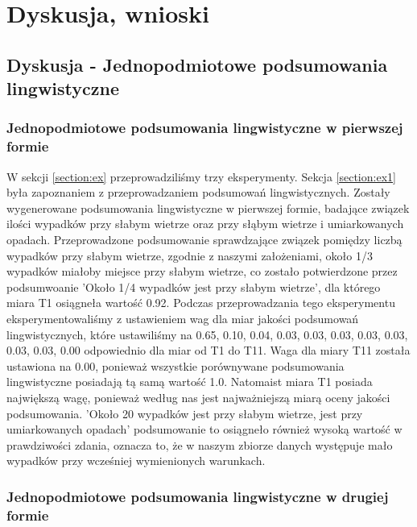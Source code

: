 \documentclass{classrep}
\begin{document}
\newpage


\section{Dyskusja, wnioski}
\subsection{Dyskusja - Jednopodmiotowe podsumowania lingwistyczne}

\subsubsection{Jednopodmiotowe podsumowania lingwistyczne w pierwszej formie}

W sekcji \ref{section:ex} przeprowadziliśmy trzy eksperymenty. Sekcja \ref{section:ex1} była zapoznaniem z przeprowadzaniem podsumowań lingwistycznych. Zostały wygenerowane podsumowania lingwistyczne w pierwszej formie, badające związek ilości wypadków przy słabym wietrze oraz przy słąbym wietrze i umiarkowanych opadach. Przeprowadzone podsumowanie sprawdzające związek pomiędzy liczbą wypadków przy słabym wietrze, zgodnie z naszymi założeniami, około 1/3 wypadków miałoby miejsce przy słabym wietrze, co zostało potwierdzone przez podsumwoanie 'Około 1/4 wypadków jest przy słabym wietrze', dla którego miara T1 osiągneła wartość 0.92. Podczas przeprowadzania tego eksperymentu eksperymentowaliśmy z ustawieniem wag dla miar jakości podsumowań lingwistycznych, które ustawiliśmy na 0.65, 0.10, 0.04, 0.03, 0.03, 0.03, 0.03, 0.03, 0.03, 0.03, 0.00 odpowiednio dla miar od T1 do T11. Waga dla miary T11 została ustawiona na 0.00, ponieważ wszystkie porównywane podsumowania lingwistyczne posiadają tą samą wartość 1.0. Natomaist miara T1 posiada największą wagę, ponieważ według nas jest najważniejszą miarą oceny jakości podsumowania. 'Około 20 wypadków jest przy słabym wietrze, jest przy umiarkowanych opadach' podsumowanie to osiągneło również wysoką wartość w prawdziwości zdania, oznacza to, że w naszym zbiorze danych występuje mało wypadków przy wcześniej wymienionych warunkach. \\

\subsubsection{Jednopodmiotowe podsumowania lingwistyczne w drugiej formie}
\end{document}
